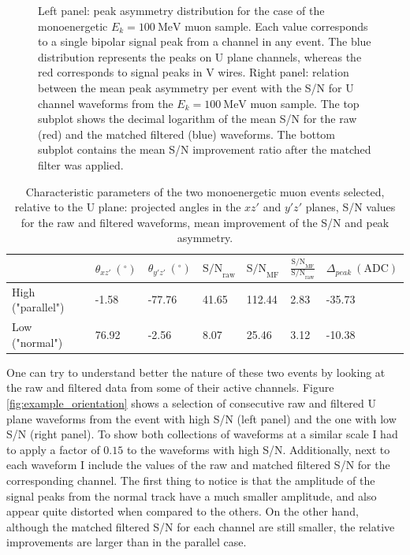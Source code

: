 \begin{figure}[t]
	\caption[Distribution of the peak asymmetry for the monoenergetic muon sample and dependence of the S/N change on the mean peak asymmetry of the event.]{Left panel: peak asymmetry distribution for the case of the monoenergetic $E_{k} = 100 \ \mathrm{MeV}$ muon sample. Each value corresponds to a single bipolar signal peak from a channel in any event. The blue distribution represents the peaks on U plane channels, whereas the red corresponds to signal peaks in V wires. Right panel: relation between the mean peak asymmetry per event with the S/N for U channel waveforms from the $E_{k} = 100 \ \mathrm{MeV}$ muon sample. The top subplot shows the decimal logarithm of the mean S/N for the raw (red) and the matched filtered (blue) waveforms. The bottom subplot contains the mean S/N improvement ratio after the matched filter was applied.}
	\label{fig:asymmetry}
\end{figure}

\begin{table}[h!]
	\centering
	\caption[Characteristic parameters of the two monoenergetic muon events selected for the peak asymmetry study.]{Characteristic parameters of the two monoenergetic muon events selected, relative to the U plane: projected angles in the $xz'$ and $y'z'$ planes, S/N values for the raw and filtered waveforms, mean improvement of the S/N and peak asymmetry.}
	\begin{tabular}{l|llllll}
		& $\theta_{xz'} \ (^{\circ})$ & $\theta_{y'z'} \ (^{\circ})$ & $\mathrm{S/N}_{\mathrm{raw}}$ & $\mathrm{S/N}_{\mathrm{MF}}$ & $\frac{\mathrm{S/N}_{\mathrm{MF}}}{\mathrm{S/N}_{\mathrm{raw}}}$ & $\Delta_{peak} \ (\mathrm{ADC})$ \\ \hline
		High ("parallel") & -1.58                     & -77.76                     & 41.65       & 112.44      & 2.83                          & -35.73                                                          \\
		Low ("normal")  & 76.92                     & -2.56                      & 8.07        & 25.46       & 3.12                          & -10.38                                                         
	\end{tabular}
	\label{tab:case}
\end{table}

One can try to understand better the nature of these two events by looking at the raw and filtered data from some of their active channels. Figure \ref{fig:example_orientation} shows a selection of consecutive raw and filtered U plane waveforms from the event with high S/N (left panel) and the one with low S/N (right panel). To show both collections of waveforms at a similar scale I had to apply a factor of $0.15$ to the waveforms with high S/N. Additionally, next to each waveform I include the values of the raw and matched filtered S/N for the corresponding channel. The first thing to notice is that the amplitude of the signal peaks from the normal track have a much smaller amplitude, and also appear quite distorted when compared to the others. On the other hand, although the matched filtered S/N for each channel are still smaller, the relative improvements are larger than in the parallel case.

